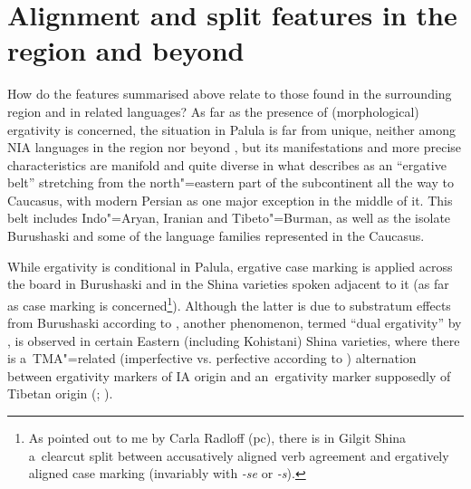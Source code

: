 \section{Alignment and split features in the region and beyond}
\label{sec:11-4}


How do the features summarised above relate to those found in the surrounding region and in related languages? As far as the presence of (morphological) ergativity is concerned, the situation in Palula is far from unique, neither among NIA languages in the region \citep{edelman1983,skalmowski1974,liljegren2014} nor beyond \citep{deosharma2006,klaiman1987,stronski2009,verbeke2011}, but its manifestations and more precise characteristics are manifold and quite diverse in what \citet[250]{masica2001} describes as an ``ergative belt'' stretching from the north"=eastern part of the subcontinent all the way to Caucasus, with modern Persian as one major exception in the middle of it. This belt includes Indo"=Aryan, Iranian and Tibeto"=Burman, as well as the isolate Burushaski and some of the language families represented in the Caucasus. 



While ergativity is conditional in Palula, ergative case marking is applied across the board in Burushaski and in the Shina varieties spoken adjacent to it (as far as case marking is concerned\footnote{As pointed out to me by Carla Radloff (pc), there is in Gilgit Shina a~clearcut split between accusatively aligned verb agreement and ergatively aligned case marking (invariably with \textit{-se} or \textit{-s}).}). Although the latter is due to substratum effects from Burushaski according to \citet[248]{masica2001}, another phenomenon, termed ``dual ergativity'' by \citet[213]{hookkoul2004}, is observed in certain Eastern (including Kohistani) Shina varieties, where there is a~TMA"=related (imperfective vs. perfective according to \citealt[51--53]{schmidtkohistani2008}) alternation between ergativity markers of IA origin and an~ergativity marker supposedly of Tibetan origin (\citealt[214]{hookkoul2004}; \citealt[211]{bailey1924}). 




